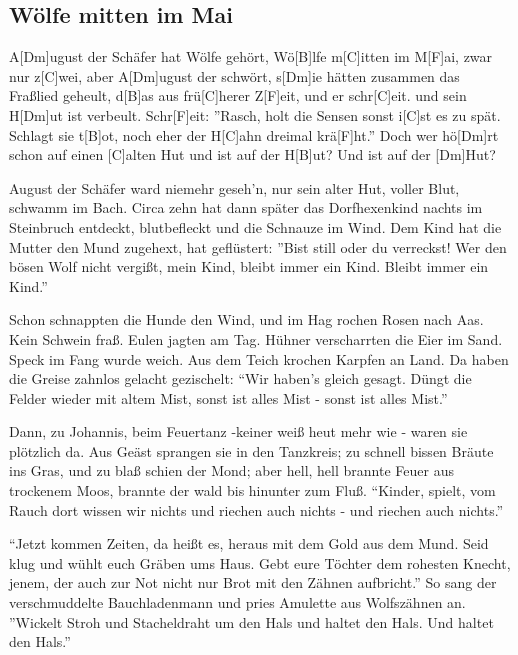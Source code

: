 \subsection*{Wölfe mitten im Mai   }
\begin{guitar}
  \begin{multicols}{2}
A[Dm]ugust der Schäfer hat Wölfe gehört,
Wö[B]lfe m[C]itten im M[F]ai, zwar nur z[C]wei,
aber A[Dm]ugust der schwört,
s[Dm]ie hätten zusammen das Fraßlied geheult,
d[B]as aus frü[C]herer Z[F]eit, und er schr[C]eit.
und sein H[Dm]ut ist verbeult.
Schr[F]eit: ''Rasch, holt die Sensen sonst i[C]st es zu spät.
Schlagt sie t[B]ot, noch eher der H[C]ahn dreimal krä[F]ht.''
Doch wer hö[Dm]rt schon auf einen [C]alten Hut
und ist auf der H[B]ut? Und ist auf der [Dm]Hut?



August der Schäfer ward niemehr geseh'n,
nur sein alter Hut, voller Blut,
schwamm im Bach. Circa zehn
hat dann später das Dorfhexenkind
nachts im Steinbruch entdeckt, blutbefleckt
und die Schnauze im Wind.
Dem Kind hat die Mutter den Mund zugehext,
hat geflüstert: ''Bist still oder du verreckst!
Wer den bösen Wolf nicht vergißt, mein Kind,
bleibt immer ein Kind. Bleibt immer ein Kind.''


Schon schnappten die Hunde den Wind, und im Hag
rochen Rosen nach Aas. Kein Schwein fraß.
Eulen jagten am Tag.
Hühner verscharrten die Eier im Sand.
Speck im Fang wurde weich. Aus dem Teich
krochen Karpfen an Land.
Da haben die Greise zahnlos gelacht
gezischelt: ``Wir haben's gleich gesagt.
Düngt die Felder wieder mit altem Mist,
sonst ist alles Mist - sonst ist alles Mist.''

Dann, zu Johannis, beim Feuertanz
-keiner weiß heut mehr wie - 
waren sie
plötzlich da. Aus Geäst
sprangen sie in den Tanzkreis; zu schnell
bissen Bräute ins Gras,
und zu blaß
schien der Mond; aber hell,
hell brannte Feuer aus trockenem Moos,
brannte der wald bis hinunter zum Fluß.
``Kinder, spielt, vom Rauch dort wissen wir nichts
und riechen auch nichts - und riechen auch nichts.''


\columnbreak
``Jetzt kommen Zeiten, da heißt es, heraus
mit dem Gold aus dem Mund.
Seid klug und
wühlt euch Gräben ums Haus.
Gebt eure Töchter dem rohesten Knecht,
jenem, der auch zur Not
nicht nur Brot
mit den Zähnen aufbricht.''
So sang der verschmuddelte Bauchladenmann
und pries Amulette aus Wolfszähnen an.
''Wickelt Stroh und Stacheldraht um den Hals
und haltet den Hals. Und haltet den Hals.''


\end{multicols}
\end{guitar}
